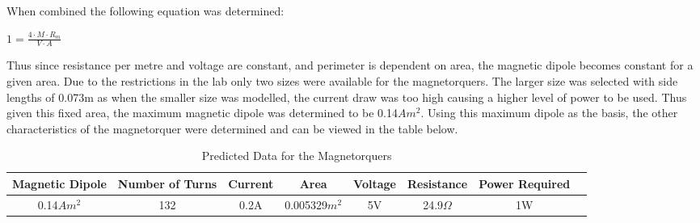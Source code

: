 When combined the following equation was determined:
\begin{center}
$1 = \frac{4 \cdot M \cdot R_m}{V \cdot A}$
\end{center}
Thus since resistance per metre and voltage are constant, and perimeter is dependent on area, the magnetic dipole becomes constant for a given area.  Due to the restrictions in the lab only two sizes were available for the magnetorquers. The larger size was selected with side lengths of 0.073m as when the smaller size was modelled, the current draw was too high causing a higher level of power to be used.  Thus given this fixed area, the maximum magnetic dipole was determined to be  0.14$Am^2$.  Using this maximum dipole as the basis, the other characteristics of the magnetorquer were determined and can be viewed in the table below.




\begin{table}[H]
\begin{center}
\caption{Predicted Data for the Magnetorquers}
\begin{tabular}{|c|c|c|c|c|c|c|c|}
\hline
Magnetic Dipole & Number of Turns & Current & Area & Voltage & Resistance & Power Required\\
\hline
0.14$Am^2$ & 132 & 0.2A & 0.005329$m^2$ & 5V & 24.9$\Omega$ & 1W\\
\hline
\end{tabular}
\end{center}
\vspace{-6mm}
\end{table}

